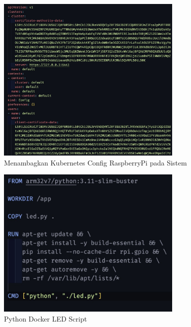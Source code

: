 \begin{figure}[ht]
  \centering
  \includegraphics[width=0.8\textwidth]{resources/chapter-4/pengujian/raspi-kube-config.jpg}
  \caption{Menambagkan Kubernetes Config RaspberryPi pada Sistem}
  \label{fig:raspi-add-kubeconfig}
\end{figure}

\begin{figure}[ht]
  \centering
  \includegraphics[width=0.8\textwidth]{resources/chapter-4/pengujian/pengujian-sistem-raspi-09-dockerfile.jpg}
  \caption{Python Docker LED Script}
  \label{fig:raspi-docker-led-script}
\end{figure}

